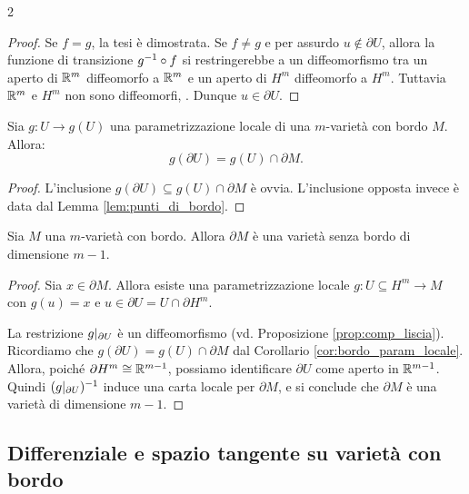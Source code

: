 \begin{multicols*}{2}
\begin{proof}
        Se $f = g$, la tesi è dimostrata. Se $f \neq g$ e per assurdo $u \notin \partial U$,
        allora la funzione di transizione $g^{-1} \circ f$ si restringerebbe a
        un diffeomorfismo tra un aperto di $\mathbb{R}^m$ diffeomorfo a $\mathbb{R}^m$ e
        un aperto di $H^m$ diffeomorfo a $H^m$. Tuttavia $\mathbb{R}^m$ e
        $H^m$ non sono diffeomorfi, \Lightning. Dunque $u \in \partial U$.
    \end{proof}

    \begin{corollary} \label{cor:bordo_param_locale}
        Sia $g : U \to g(U)$ una parametrizzazione locale di una $m$-varietà con bordo $M$. Allora:
        \[
            \boxed{g(\partial U) = g(U) \cap \partial M.}
        \]
    \end{corollary}

    \begin{proof}
        L'inclusione $g(\partial U) \subseteq g(U) \cap \partial M$ è ovvia.
        L'inclusione opposta invece è data dal Lemma \ref{lem:punti_di_bordo}.
    \end{proof}

    \begin{proposition}
        Sia $M$ una $m$-varietà con bordo. Allora $\partial M$ è
        una varietà senza bordo di dimensione $m-1$.
    \end{proposition}

    \begin{proof}
        Sia $x \in \partial M$. Allora esiste una parametrizzazione locale
        $g : U \subseteq H^m \to M$ con $g(u) = x$ e $u \in \partial U = U \cap \partial H^m$. \smallskip

        La restrizione $g\arrowvert_{\partial U}$ è un diffeomorfismo (vd. Proposizione \ref{prop:comp_liscia}). Ricordiamo che
        $g(\partial U) = g(U) \cap \partial M$ dal Corollario \ref{cor:bordo_param_locale}. Allora, poiché
        $\partial H^m \cong \mathbb{R}^{m-1}$, possiamo identificare
        $\partial U$ come aperto in $\mathbb{R}^{m-1}$. Quindi
        $(g\arrowvert_{\partial U})^{-1}$ induce una carta locale per $\partial M$,
        e si conclude che $\partial M$ è una varietà di dimensione $m-1$. \smallskip
    \end{proof}

    \subsection{Differenziale e spazio tangente su varietà con bordo}


\end{multicols*}
